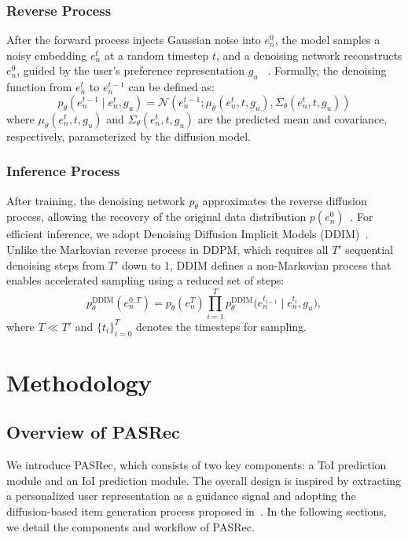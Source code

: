 \documentclass[sigconf,nonacm]{acmart}
\newcommand{\modelname}{PASRec}
\begin{document}
\subsubsection{Reverse Process} 
\label{subsubsec:Reverse}
After the forward process injects Gaussian noise into \( e_{n}^{0} \), the model samples a noisy embedding \( e_{n}^{t} \) at a random timestep \( t \), and a denoising network reconstructs \( e_{n}^{0} \), guided by the user's preference representation \( g_u \) ~\cite{liu2024preference}. Formally, the denoising function from \( e_{n}^t \) to \( e_{n}^{t-1} \) can be defined as:
\begin{equation}
p_\theta(e_{n}^{t-1} \mid e_{n}^t, g_u) = \mathcal{N}(e_{n}^{t-1}; {\mu}_\theta(e_{n}^t, t, g_u), {\Sigma}_\theta(e_{n}^t, t, g_u))
\end{equation}
where \( {\mu}_\theta(e_{n}^t, t, g_u) \) and \( {\Sigma}_\theta(e_{n}^t, t, g_u) \) are the predicted mean and covariance, respectively, parameterized by the diffusion model.

\subsubsection{Inference Process}
\label{subsubsec:inference_process}
After training, the denoising network \( p_\theta \) approximates the reverse diffusion process, 
allowing the recovery of the original data distribution \( p(e_{n}^{0}) \)~\cite{ma2024graph}. For efficient inference, we adopt Denoising Diffusion Implicit Models (DDIM)~\cite{song2020denoising}. Unlike the Markovian reverse process in DDPM, which requires all \(T'\) sequential denoising steps from \(T'\) down to 1, DDIM defines a non-Markovian process that enables accelerated sampling using a reduced set of steps:
\begin{equation}
p_\theta^{\text{DDIM}}(e_n^{0:T}) 
= p_\theta(e_n^T) 
\prod_{i=1}^{T} 
p_\theta^{\text{DDIM}}\big(e_n^{t_{i-1}} \mid e_n^{t_i}, g_u \big),
\end{equation}
where \(T \ll T'\) and \(\{t_i\}_{i=0}^{T}\) denotes the timesteps for sampling.


\section{Methodology}

\subsection{Overview of \modelname}
We introduce \modelname, which consists of two key components: a ToI prediction module and an IoI prediction module. The overall design is inspired by extracting a personalized user representation as a guidance signal and adopting the diffusion-based item generation process proposed in~\cite{yang2023generate, liu2024preference}. In the following sections, we detail the components and workflow of \modelname.
\end{document}
